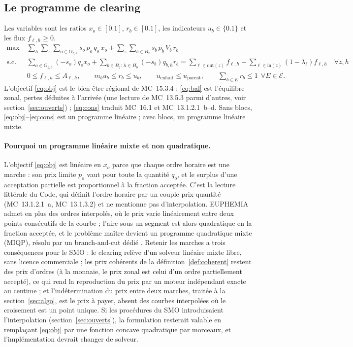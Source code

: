 \documentclass[a4paper,12pt]{article}
\theoremstyle{definition}
\newcommand{\MC}[1]{MC~#1}
\begin{document}
\subsection{Le programme de clearing}

Les variables sont les ratios $x_o\in[0.1]$, $r_b\in[0.1]$, les indicateurs $u_b\in\{0.1\}$ et les flux $f_{\ell,h}\ge0$.
\begin{align}
\max\;& \sum_{h}\sum_{z}\sum_{o\in O_{z,h}} s_o\,p_o\,q_o\,x_o + \sum_z\sum_{b\in B_z} s_b\,p_b\,V_b\,r_b \label{eq:obj}\\
\text{s.c.}\;& \sum_{o\in O_{z,h}}(-s_o)q_o x_o + \sum_{b\in B_z:\,h\in H_b}(-s_b)q_{b,h}r_b = \sum_{\ell\in\mathrm{out}(z)} f_{\ell,h} - \sum_{\ell\in\mathrm{in}(z)}(1-\lambda_\ell)f_{\ell,h} \quad\forall z,h \label{eq:bal}\\
& 0\le f_{\ell,h}\le A_{\ell,h},\qquad m_b u_b\le r_b\le u_b,\qquad u_{\text{enfant}}\le u_{\text{parent}},\qquad \sum_{b\in E} r_b\le 1\ \ \forall E\in\mathcal E. \label{eq:cons}
\end{align}
L'objectif \eqref{eq:obj} est le bien-être régional de \MC{15.3.4} ; \eqref{eq:bal} est l'équilibre zonal, pertes déduites à l'arrivée (une lecture de \MC{13.5.3} parmi d'autres, voir section~\ref{sec:ouverts}) ; \eqref{eq:cons} traduit \MC{16.1} et \MC{13.1.2.1}~b--d. Sans blocs, \eqref{eq:obj}--\eqref{eq:cons} est un programme linéaire ; avec blocs, un programme linéaire mixte.

\paragraph{Pourquoi un programme linéaire mixte et non quadratique.} L'objectif \eqref{eq:obj} est linéaire en $x_o$ parce que chaque ordre horaire est une marche : son prix limite $p_o$ vaut pour toute la quantité $q_o$, et le surplus d'une acceptation partielle est proportionnel à la fraction acceptée. C'est la lecture littérale du Code, qui définit l'ordre horaire par un couple prix-quantité (\MC{13.1.2.1}~a, \MC{13.1.3.2}) et ne mentionne pas d'interpolation. EUPHEMIA admet en plus des ordres interpolés, où le prix varie linéairement entre deux points consécutifs de la courbe ; l'aire sous un segment est alors quadratique en la fraction acceptée, et le problème maître devient un programme quadratique mixte (MIQP), résolu par un branch-and-cut dédié \citep[§5.1, §7.4 et §8]{euphemia2025}. Retenir les marches a trois conséquences pour le SMO : le clearing relève d'un solveur linéaire mixte libre, sans licence commerciale ; les prix cohérents de la définition~\ref{def:coherent} restent des prix d'ordres (à la monnaie, le prix zonal est celui d'un ordre partiellement accepté), ce qui rend la reproduction du prix par un moteur indépendant exacte au centime ; et l'indétermination du prix entre deux marches, traitée à la section~\ref{sec:algo}, est le prix à payer, absent des courbes interpolées où le croisement est un point unique. Si les procédures du SMO introduisaient l'interpolation (section~\ref{sec:ouverts}), la formulation resterait valable en remplaçant \eqref{eq:obj} par une fonction concave quadratique par morceaux, et l'implémentation devrait changer de solveur.
\end{document}
